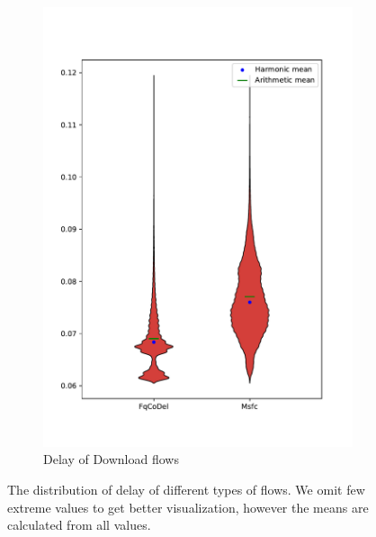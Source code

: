 \begin{figure}
\begin{subfigure}[b]{0.475\textwidth}
		\includegraphics[width=\textwidth]{drawings/type5-delay-down}
		\caption[]%
		{{\small Delay of Download flows}}    
		\label{fig:delay_download}
	\end{subfigure}
	\caption[ The average and standard deviation of critical parameters ]
	{\small The distribution of delay of different types of flows. We omit few extreme values to get better visualization, however the means are calculated from all values.} 
	\label{fig:delay_flows}
\end{figure}


